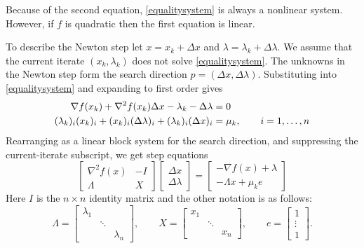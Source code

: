 \documentclass[11pt]{article}
\newcommand{\grad}{\nabla}
\begin{document}
Because of the second equation, \eqref{equalitysystem} is always a nonlinear system.  However, if $f$ is quadratic then the first equation is linear.

To describe the Newton step let $x=x_k+\Delta x$ and $\lambda=\lambda_k+\Delta\lambda$.  We assume that the current iterate $(x_k,\lambda_k)$ does not solve \eqref{equalitysystem}.  The unknowns in the Newton step form the search direction $p=(\Delta x,\Delta \lambda)$.  Substituting into \eqref{equalitysystem} and expanding to first order gives
\begin{align}
\grad f(x_k) + \grad^2 f(x_k) \Delta x - \lambda_k - \Delta \lambda &= 0 \label{prenewtonstep} \\
(\lambda_k)_i (x_k)_i + (x_k)_i (\Delta\lambda)_i + (\lambda_k)_i (\Delta x)_i &= \mu_k, \qquad i=1,\dots,n \notag
\end{align}
Rearranging as a linear block system for the search direction, and suppressing the current-iterate subscript, we get step equations
\begin{equation}
\begin{bmatrix}
\grad^2 f(x) & - I \\
\Lambda & X
\end{bmatrix}
\begin{bmatrix}
\Delta x \\
\Delta \lambda
\end{bmatrix}
=
\begin{bmatrix}
-\grad f(x) + \lambda \\
-\Lambda x + \mu_k e
\end{bmatrix}
 \label{newtonstep}
\end{equation}
Here $I$ is the $n\times n$ identity matrix and the other notation is as follows:
    $$\Lambda = \begin{bmatrix} \lambda_1 & & \\ & \ddots & \\ & & \lambda_n \end{bmatrix}, \qquad X = \begin{bmatrix} x_1 & & \\ & \ddots & \\ & & x_n \end{bmatrix}, \qquad e = \begin{bmatrix} 1 \\ \vdots \\ 1 \end{bmatrix}.$$
\end{document}

